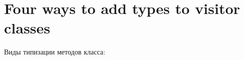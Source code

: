 \documentclass[acmsmall,review,anonymous]{acmart}\settopmatter{printfolios=true,printccs=false,printacmref=false}
\let\listinline\lstinline
\begin{document}
% 
% 

\section{Four ways to add types to visitor classes}
Виды типизации методов класса:
\end{document}
